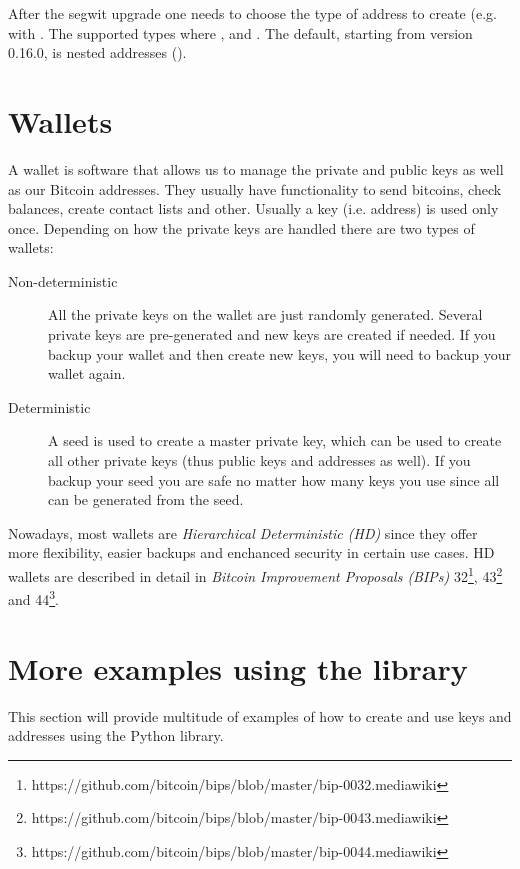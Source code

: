 \begin{note}
After the segwit upgrade one needs to choose the type of address to create (e.g. with . The supported types where ,  and . The default, starting from version 0.16.0, is nested addresses ().
\end{note}


\section{Wallets}

A wallet is software that allows us to manage the private and public keys as well as our Bitcoin addresses. They usually have functionality to send bitcoins, check balances, create contact lists and other. Usually a key (i.e. address) is used only once. Depending on how the private keys are handled there are two types of wallets:

\begin{description}
\item[Non-deterministic] All the private keys on the wallet are just randomly generated. Several private keys are pre-generated and new keys are created if needed. If you backup your wallet and then create new keys, you will need to backup your wallet again.
\item[Deterministic] A seed is used to create a master private key, which can be used to create all other private keys (thus public keys and addresses as well). If you backup your seed you are safe no matter how many keys you use since all can be generated from the seed.
\end{description}

Nowadays, most wallets are \emph{Hierarchical Deterministic (HD)} since they offer more flexibility, easier backups and enchanced security in certain use cases. HD wallets are described in detail in \emph{Bitcoin Improvement Proposals (BIPs)} 32\footnote{https://github.com/bitcoin/bips/blob/master/bip-0032.mediawiki}, 43\footnote{https://github.com/bitcoin/bips/blob/master/bip-0043.mediawiki} and 44\footnote{https://github.com/bitcoin/bips/blob/master/bip-0044.mediawiki}. 


\section{More examples using the  library}
This section will provide multitude of examples of how to create and use keys and addresses using the  Python library.

